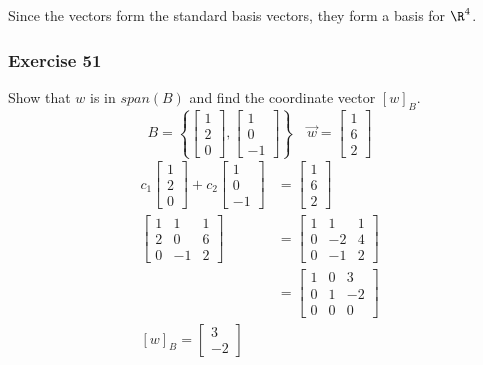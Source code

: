 \documentclass[letterpaper, 12pt]{math}
\begin{document}
Since the vectors form the standard basis vectors, they form a basis for
\( \R^4 \).

\subsubsection*{Exercise 51}
Show that \( w \) is in \( span(B) \) and find the coordinate vector
\( [w]_B \).
\[ B = \left\{\begin{bmatrix}1 \\ 2 \\ 0\end{bmatrix},
  \begin{bmatrix}1 \\ 0 \\ -1\end{bmatrix}\right\} \quad
  \vec{w} = \begin{bmatrix}1 \\ 6 \\ 2\end{bmatrix} \]
\begin{align*}
  c_1\begin{bmatrix}1 \\ 2 \\ 0\end{bmatrix}+
    c_2\begin{bmatrix}1 \\ 0 \\ -1\end{bmatrix} &=
    \begin{bmatrix}1 \\ 6 \\ 2\end{bmatrix} \\
  \begin{bmatrix}
    1 & 1 & 1 \\
    2 & 0 & 6 \\
    0 & -1 & 2
  \end{bmatrix} &= \begin{bmatrix}
    1 & 1 & 1 \\
    0 & -2 & 4 \\
    0 & -1 & 2
  \end{bmatrix} \\
  &= \begin{bmatrix}
    1 & 0 & 3 \\
    0 & 1 & -2 \\
    0 & 0 & 0
  \end{bmatrix} \\
  [w]_B = \begin{bmatrix}3 \\ -2\end{bmatrix}
\end{align*}
\end{document}
